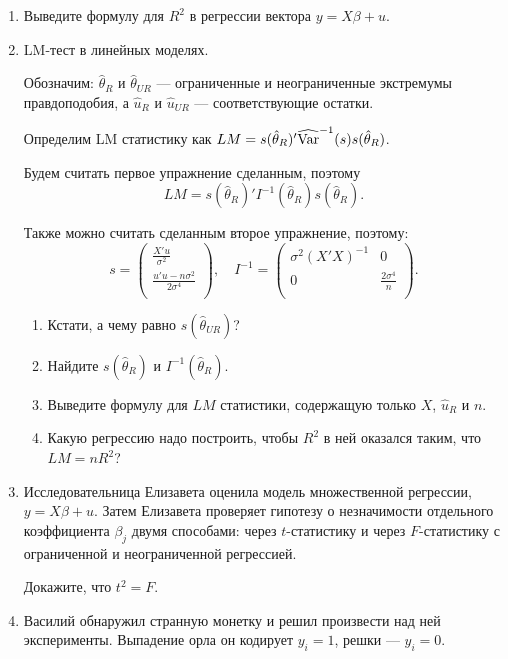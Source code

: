 \documentclass[12pt, a4paper]{article}
\begin{document}
\begin{enumerate}
\item Выведите формулу для $R^2$ в регрессии вектора $y=X\beta+u$.

\item LM-тест в линейных моделях.

Обозначим: $\hat\theta_R$ и $\hat\theta_{UR}$ — ограниченные и неограниченные экстремумы правдоподобия, а $\hat u_R$ и $\hat u_{UR}$ — соответствующие остатки.

Определим LM статистику как $LM = s(\hat\theta_R)'\widehat{\operatorname{Var}}^{-1}(s)s(\hat\theta_R)$.

Будем считать первое упражнение сделанным, поэтому
\[
LM = s(\hat\theta_R)'I^{-1}(\hat\theta_R)s(\hat\theta_R).
\]

Также можно считать сделанным второе упражнение, поэтому:
\[
s=\begin{pmatrix}
\frac{X'u}{\sigma^2} \\
\frac{u'u - n\sigma^2}{2\sigma^4} \\
\end{pmatrix}, \quad
I^{-1} =
\begin{pmatrix}
\sigma^2(X'X)^{-1} & 0 \\
0 & \frac{2\sigma^4}{n} \\
\end{pmatrix}.
\]

\begin{enumerate}
\item Кстати, а чему равно $s(\hat\theta_{UR})$?
\item Найдите $s(\hat\theta_R)$ и $I^{-1}(\hat\theta_R)$.
\item Выведите формулу для $LM$ статистики, содержащую только $X$, $\hat u_R$ и $n$.
\item Какую регрессию надо построить, чтобы $R^2$ в ней оказался таким, что $LM=nR^2$?
\end{enumerate}


\item Исследовательница Елизавета оценила модель множественной регрессии, $y=X\beta + u$. Затем Елизавета проверяет гипотезу о незначимости отдельного коэффициента $\beta_j$ двумя способами: через $t$-статистику и через $F$-статистику с ограниченной и неограниченной регрессией.

Докажите, что $t^2 = F$.


\item Василий обнаружил странную монетку и решил произвести над ней эксперименты. Выпадение орла он кодирует $y_i=1$, решки — $y_i=0$.


\end{enumerate}
\end{document}
